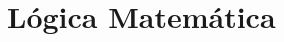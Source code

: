 \documentclass[../../main]{subfiles}
\begin{document}
    \section{Lógica Matemática}\label{section:logica-matematica}

    
    
\end{document}
